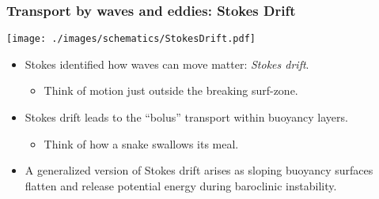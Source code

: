 \documentclass[10pt]{beamer}
\begin{document}
\begin{frame}
  \frametitle{Transport by waves and eddies: Stokes Drift}

\begin{center}
\vspace{-.25cm}
{\texttt{[image: ./images/schematics/StokesDrift.pdf]}}
\vspace{-.5cm}
\end{center}

\begin{exampleblock}{}
\begin{itemize}
\item Stokes identified how waves can move matter: {\it Stokes drift}.
    \begin{itemize}
         \item Think of motion just outside the breaking surf-zone.  
    \end{itemize}

  \item Stokes drift leads to the ``bolus'' transport within buoyancy
    layers.
    \begin{itemize}
    \item Think of how a snake swallows its meal.
    \end{itemize}

  \item A generalized version of Stokes drift arises as sloping
    buoyancy surfaces flatten and release potential energy during
    baroclinic instability.


\end{itemize}
\end{exampleblock}{}

\end{frame}
\end{document}
